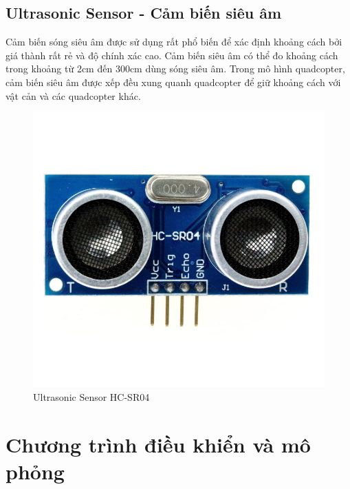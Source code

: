    \subsection{Ultrasonic Sensor - Cảm biến siêu âm}
   Cảm biến sóng siêu âm được sử dụng rất phổ biến để xác định khoảng cách bởi giá thành rất rẻ và độ chính xác cao. Cảm biến siêu âm có thể đo khoảng cách trong khoảng từ 2cm đến 300cm dùng sóng siêu âm.
   Trong mô hình quadcopter, cảm biến siêu âm được xếp đều xung quanh quadcopter để giữ khoảng cách với vật cản và các quadcopter khác.
   
   \begin{figure}[h!]
    	\begin{center}
    		\includegraphics[scale=0.1]{images/ultrasonicsensor.jpg}
    		\caption{Ultrasonic Sensor HC-SR04}
    	\end{center}
    \end{figure}
   
    \section{Chương trình điều khiển và mô phỏng}
